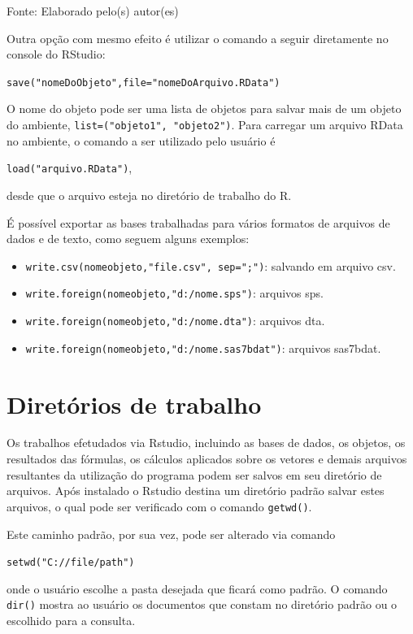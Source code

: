 \documentclass[12pt,brazil,oneside]{book}
\providecommand{\tightlist}{%
  \setlength{\itemsep}{0pt}\setlength{\parskip}{0pt}}
\begin{document}
Fonte: Elaborado pelo(s) autor(es)

Outra opção com mesmo efeito é utilizar o comando a seguir diretamente
no console do RStudio:

\texttt{save("nomeDoObjeto",file="nomeDoArquivo.RData")}

O nome do objeto pode ser uma lista de objetos para salvar mais de um
objeto do ambiente, \texttt{list=("objeto1",\ "objeto2")}. Para carregar
um arquivo RData no ambiente, o comando a ser utilizado pelo usuário é

\texttt{load("arquivo.RData")},

desde que o arquivo esteja no diretório de trabalho do R.

É possível exportar as bases trabalhadas para vários formatos de
arquivos de dados e de texto, como seguem alguns exemplos:

\begin{itemize}
\tightlist
\item
  \texttt{write.csv(nomeobjeto,"file.csv",\ sep=";")}: salvando em
  arquivo csv.
\item
  \texttt{write.foreign(nomeobjeto,"d:/nome.sps")}: arquivos sps.
\item
  \texttt{write.foreign(nomeobjeto,"d:/nome.dta")}: arquivos dta.
\item
  \texttt{write.foreign(nomeobjeto,"d:/nome.sas7bdat")}: arquivos
  sas7bdat.
\end{itemize}

\hypertarget{diretorios-de-trabalho}{%
\section{Diretórios de trabalho}\label{diretorios-de-trabalho}}

Os trabalhos efetudados via Rstudio, incluindo as bases de dados, os
objetos, os resultados das fórmulas, os cálculos aplicados sobre os
vetores e demais arquivos resultantes da utilização do programa podem
ser salvos em seu diretório de arquivos. Após instalado o Rstudio
destina um diretório padrão salvar estes arquivos, o qual pode ser
verificado com o comando \texttt{getwd()}.

Este caminho padrão, por sua vez, pode ser alterado via comando

\texttt{setwd("C://file/path")}

onde o usuário escolhe a pasta desejada que ficará como padrão. O
comando \texttt{dir()} mostra ao usuário os documentos que constam no
diretório padrão ou o escolhido para a consulta.
\end{document}
